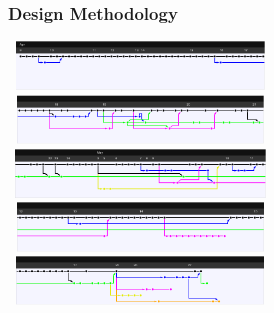 \documentclass[10pt]{beamer}
\newcommand{\bcen}{\begin{center}}
\newcommand{\ecen}{\end{center}}
\begin{document}
\begin{frame}
\frametitle{Design Methodology}
  \bcen
  \includegraphics[height=1.3cm,width=7cm]{line1}\\
  \includegraphics[height=1.3cm,width=7cm]{line2}\\
  \includegraphics[height=1.3cm,width=7cm]{line3}\\
  \includegraphics[height=1.3cm,width=7cm]{line4}\\
  \includegraphics[height=1.3cm,width=7cm]{line5}
  \ecen
\end{frame}
\end{document}
